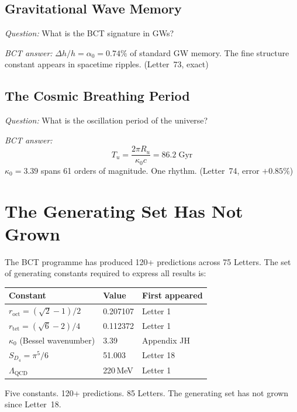 \documentclass[aps,prl,twocolumn,superscriptaddress,floatfix]{revtex4-2}
\begin{document}
\subsection{Gravitational Wave Memory}

\noindent\textit{Question:} What is the BCT signature in GWs?

\noindent\textit{BCT answer:}
$\Delta h/h = \alpha_0 = 0.74\%$ of standard GW memory.
The fine structure constant appears in spacetime ripples.
(Letter~73, exact)

\subsection{The Cosmic Breathing Period}

\noindent\textit{Question:} What is the oscillation period
of the universe?

\noindent\textit{BCT answer:}
\begin{equation}
  T_u = \frac{2\pi R_u}{\kappa_0 c} = 86.2\;\mathrm{Gyr}
\end{equation}
$\kappa_0 = 3.39$ spans 61 orders of magnitude.
One rhythm. (Letter~74, error $+0.85\%$)

\section{The Generating Set Has Not Grown}

The BCT programme has produced 120+ predictions across 75 Letters.
The set of generating constants required to express all results is:

\begin{center}
\begin{tabular}{lll}
\toprule
Constant & Value & First appeared \\
\midrule
$r_\mathrm{oct} = (\sqrt{2}-1)/2$ & 0.207107 & Letter 1 \\
$r_\mathrm{tet} = (\sqrt{6}-2)/4$ & 0.112372 & Letter 1 \\
$\kappa_0$ (Bessel wavenumber) & 3.39 & Appendix JH \\
$S_{D_4} = \pi^5/6$ & 51.003 & Letter 18 \\
$\Lambda_\mathrm{QCD}$ & 220\,MeV & Letter 1 \\
\bottomrule
\end{tabular}
\end{center}

Five constants. 120+ predictions. 85 Letters. The generating set
has not grown since Letter~18.
\end{document}
